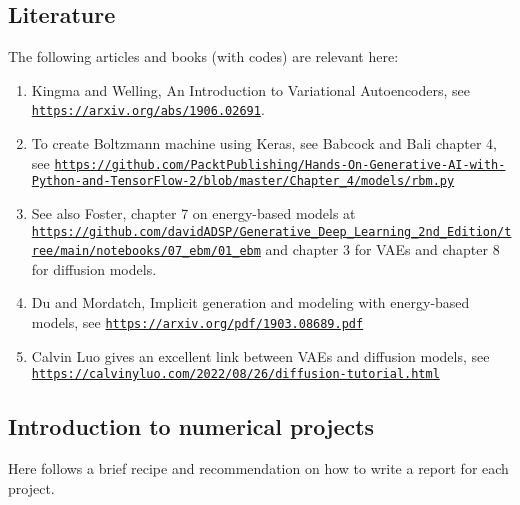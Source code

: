 \documentclass[%
oneside,                 %
final,                   %
10pt]{article}
\begin{document}
\noindent
\subsection{Literature}

The following articles and books (with codes) are relevant here:

\begin{enumerate}
\item Kingma and Welling, An Introduction to Variational Autoencoders, see \href{{https://arxiv.org/abs/1906.02691}}{\nolinkurl{https://arxiv.org/abs/1906.02691}}.

\item To create Boltzmann machine using Keras, see Babcock and Bali chapter 4, see \href{{https://github.com/PacktPublishing/Hands-On-Generative-AI-with-Python-and-TensorFlow-2/blob/master/Chapter_4/models/rbm.py}}{\nolinkurl{https://github.com/PacktPublishing/Hands-On-Generative-AI-with-Python-and-TensorFlow-2/blob/master/Chapter_4/models/rbm.py}}

\item See also Foster, chapter 7 on energy-based models at \href{{https://github.com/davidADSP/Generative_Deep_Learning_2nd_Edition/tree/main/notebooks/07_ebm/01_ebm}}{\nolinkurl{https://github.com/davidADSP/Generative_Deep_Learning_2nd_Edition/tree/main/notebooks/07_ebm/01_ebm}} and chapter 3 for VAEs and chapter 8 for diffusion models.

\item Du and Mordatch, Implicit generation and modeling with energy-based models, see \href{{https://arxiv.org/pdf/1903.08689.pdf}}{\nolinkurl{https://arxiv.org/pdf/1903.08689.pdf}}

\item Calvin Luo gives an excellent link between VAEs and diffusion models, see \href{{https://calvinyluo.com/2022/08/26/diffusion-tutorial.html}}{\nolinkurl{https://calvinyluo.com/2022/08/26/diffusion-tutorial.html}}
\end{enumerate}

\noindent
\subsection{Introduction to numerical projects}

Here follows a brief recipe and recommendation on how to write a report for each
project.
\end{document}
